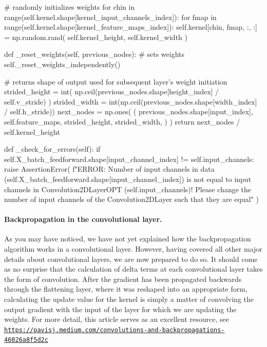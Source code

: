\documentclass[%
oneside,                 %
final,                   %
10pt]{article}
\begin{document}
        # randomly initializes weights
        for chin in range(self.kernel.shape[kernel_input_channels_index]):
            for fmap in range(self.kernel.shape[kernel_feature_maps_index]):
                self.kernel[chin, fmap, :, :] = np.random.rand(
                    self.kernel_height, self.kernel_width
                )

    def _reset_weights(self, previous_nodes):
        # sets weights
        self._reset_weights_independently()

        # returns shape of output used for subsequent layer's weight initiation
        strided_height = int(
            np.ceil(previous_nodes.shape[height_index] / self.v_stride)
        )
        strided_width = int(np.ceil(previous_nodes.shape[width_index] / self.h_stride))
        next_nodes = np.ones(
            (
                previous_nodes.shape[input_index],
                self.feature_maps,
                strided_height,
                strided_width,
            )
        )
        return next_nodes / self.kernel_height

    def _check_for_errors(self):
        if self.X_batch_feedforward.shape[input_channel_index] != self.input_channels:
            raise AssertionError(
                f"ERROR: Number of input channels in data ({self.X_batch_feedforward.shape[input_channel_index]}) is not equal to input channels in Convolution2DLayerOPT ({self.input_channels})! Please change the number of input channels of the Convolution2DLayer such that they are equal"
            )

\epycod


\paragraph{Backpropagation in the convolutional layer.}
As you may have noticed, we have not yet explained how the
backpropagation algorithm works in a convolutional layer. However,
having covered all other major details about convolutional layers, we
are now prepared to do so. It should come as no surprise that the
calculation of delta terms at each convolutional layer takes the form
of convolution. After the gradient has been propagated backwards
through the flattening layer, where it was reshaped into an
appropriate form, calculating the update value for the kernel is
simply a matter of convolving the output gradient with the input of
the layer for which we are updating the weights. For more detail, this
article serves as an excellent resource, see
\href{{https://pavisj.medium.com/convolutions-and-backpropagations-46026a8f5d2c}}{\nolinkurl{https://pavisj.medium.com/convolutions-and-backpropagations-46026a8f5d2c}}
\end{document}
